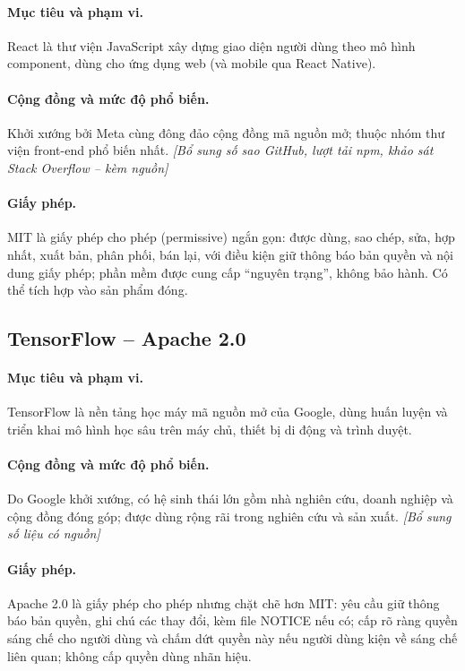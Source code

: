 \documentclass[12pt,a4paper]{article}
\begin{document}
\paragraph{Mục tiêu và phạm vi.} React là thư viện JavaScript xây dựng giao diện người dùng theo mô hình component, dùng cho ứng dụng web (và mobile qua React Native).
\paragraph{Cộng đồng và mức độ phổ biến.} Khởi xướng bởi Meta cùng đông đảo cộng đồng mã nguồn mở; thuộc nhóm thư viện front-end phổ biến nhất. \textit{[Bổ sung số sao GitHub, lượt tải npm, khảo sát Stack Overflow -- kèm nguồn]}
\paragraph{Giấy phép.} MIT là giấy phép cho phép (permissive) ngắn gọn: được dùng, sao chép, sửa, hợp nhất, xuất bản, phân phối, bán lại, với điều kiện giữ thông báo bản quyền và nội dung giấy phép; phần mềm được cung cấp ``nguyên trạng'', không bảo hành. Có thể tích hợp vào sản phẩm đóng.

\subsection{TensorFlow -- Apache 2.0}
\paragraph{Mục tiêu và phạm vi.} TensorFlow là nền tảng học máy mã nguồn mở của Google, dùng huấn luyện và triển khai mô hình học sâu trên máy chủ, thiết bị di động và trình duyệt.
\paragraph{Cộng đồng và mức độ phổ biến.} Do Google khởi xướng, có hệ sinh thái lớn gồm nhà nghiên cứu, doanh nghiệp và cộng đồng đóng góp; được dùng rộng rãi trong nghiên cứu và sản xuất. \textit{[Bổ sung số liệu có nguồn]}
\paragraph{Giấy phép.} Apache 2.0 là giấy phép cho phép nhưng chặt chẽ hơn MIT: yêu cầu giữ thông báo bản quyền, ghi chú các thay đổi, kèm file NOTICE nếu có; cấp rõ ràng quyền sáng chế cho người dùng và chấm dứt quyền này nếu người dùng kiện về sáng chế liên quan; không cấp quyền dùng nhãn hiệu.
\end{document}
